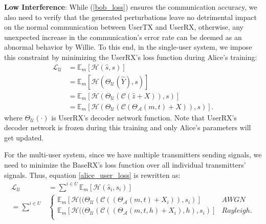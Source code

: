 \textbf{Low Interference}: While (\ref{bob_loss}) ensures the communication accuracy, we also need to verify that the generated perturbations leave no detrimental impact on the normal communication between UserTX and UserRX, otherwise, any unexpected increase in the communication's error rate can be deemed as an abnormal behavior by Willie. To this end, in the single-user system, we impose this constraint by minimizing the UserRX's loss function during Alice's training:
\begin{equation}
	\begin{aligned} \label{alice_user_loss}
	\mathcal{L}_{\mathcal{U}} & = \mathbb{E}_{m}[\mathcal{H}(\hat{s}, s)] \\
	& = \mathbb{E}_{m}[\mathcal{H}(\Theta_{\mathcal{U}}(\hat{Y}), s)] \\
	& = \mathbb{E}_{m}[\mathcal{H}(\Theta_{\mathcal{U}}(\mathcal{C}(\hat{z} + X)), s)] \\
	& = \mathbb{E}_{m}[\mathcal{H}(\Theta_{\mathcal{U}}(\mathcal{C}(\Theta_{\mathcal{A}}(m, t) + X)), s)].
	\end{aligned}
\end{equation}
where \(\Theta_{\mathcal{U}}(\cdot)\) is UserRX's decoder network function. Note that UserRX's decoder network is frozen during this training and only Alice's parameters will get updated.

For the multi-user system, since we have multiple transmitters sending signals, we need to minimize the BaseRX's loss function over all individual transmitters' signals. Thus, equation \ref{alice_user_loss} is rewritten as:
\begin{equation}
	\begin{aligned} \label{multi_alice_user_loss}
		\mathcal{L}_{\mathcal{U}} & = \sum^{i \in U}\mathbb{E}_{m}[\mathcal{H}(\hat{s}_i, s_i)] \\
		= \sum^{i \in U} & 
		\begin{cases} 
			\mathbb{E}_{m}[\mathcal{H}((\Theta_{\mathcal{U}}(\mathcal{C}((\Theta_{\mathcal{A}}(m, t) +  X_i)), s_i)] & AWGN \\
			\mathbb{E}_{m}[\mathcal{H}((\Theta_{\mathcal{U}}(\mathcal{C}((\Theta_{\mathcal{A}}(m, t, h) + X_i), h), s_i)] & Rayleigh. \\
		\end{cases} 
	\end{aligned}
\end{equation}

